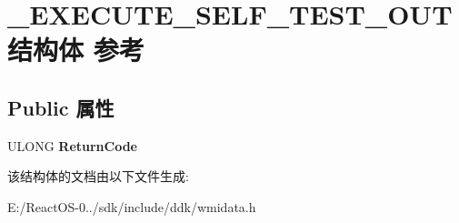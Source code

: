 \hypertarget{struct___e_x_e_c_u_t_e___s_e_l_f___t_e_s_t___o_u_t}{}\section{\+\_\+\+E\+X\+E\+C\+U\+T\+E\+\_\+\+S\+E\+L\+F\+\_\+\+T\+E\+S\+T\+\_\+\+O\+U\+T结构体 参考}
\label{struct___e_x_e_c_u_t_e___s_e_l_f___t_e_s_t___o_u_t}
\subsection*{Public 属性}
\begin{DoxyCompactItemize}
\item 
\mbox{\label{struct___e_x_e_c_u_t_e___s_e_l_f___t_e_s_t___o_u_t_a3ebb74149839c443d1d56944406e51a1}} 
U\+L\+O\+NG {\bfseries Return\+Code}
\end{DoxyCompactItemize}


该结构体的文档由以下文件生成\+:\begin{DoxyCompactItemize}
\item 
E\+:/\+React\+O\+S-\/0../sdk/include/ddk/wmidata.\+h\end{DoxyCompactItemize}

